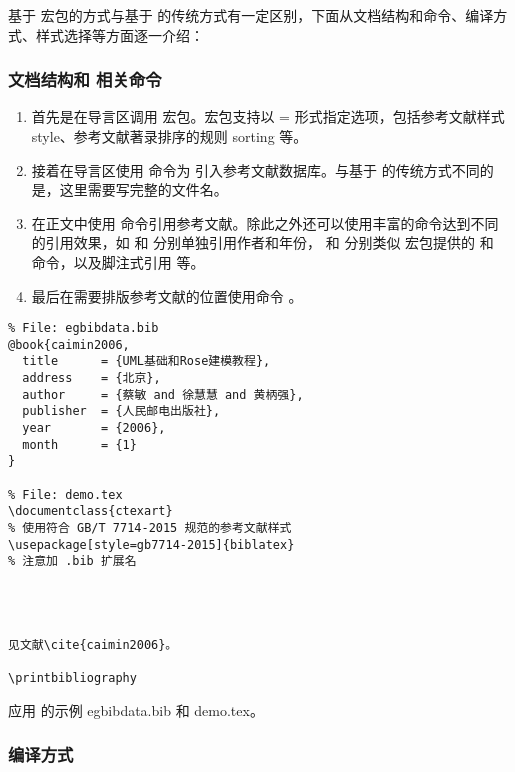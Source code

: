 基于  宏包的方式与基于  的传统方式有一定区别，下面从文档结构和命令、编译方式、样式选择等方面逐一介绍：

\subsubsection{文档结构和  相关命令}

\begin{enumerate}
  \item 首先是在导言区调用  宏包。宏包支持以 = 形式指定选项，包括参考文献样式 style、参考文献著录排序的规则 sorting 等。
  \item 接着在导言区使用  命令为  引入参考文献数据库。与基于  的传统方式不同的是，这里需要写完整的文件名。
  \item 在正文中使用  命令引用参考文献。除此之外还可以使用丰富的命令达到不同的引用效果，如  和  分别单独引用作者和年份， 和  分别类似  宏包提供的  和  命令，以及脚注式引用  等。
  \item 最后在需要排版参考文献的位置使用命令 。
\end{enumerate}

\begin{sourcecode}[htp]
\begin{Verbatim}
% File: egbibdata.bib
@book{caimin2006,
  title      = {UML基础和Rose建模教程},
  address    = {北京},
  author     = {蔡敏 and 徐慧慧 and 黄柄强},
  publisher  = {人民邮电出版社},
  year       = {2006},
  month      = {1}
}

% File: demo.tex
\documentclass{ctexart}
% 使用符合 GB/T 7714-2015 规范的参考文献样式
\usepackage[style=gb7714-2015]{biblatex}
% 注意加 .bib 扩展名




见文献\cite{caimin2006}。

\printbibliography

\end{Verbatim}
\caption{应用  的示例 egbibdata.bib 和 demo.tex。}
\end{sourcecode}

\subsubsection{编译方式}

